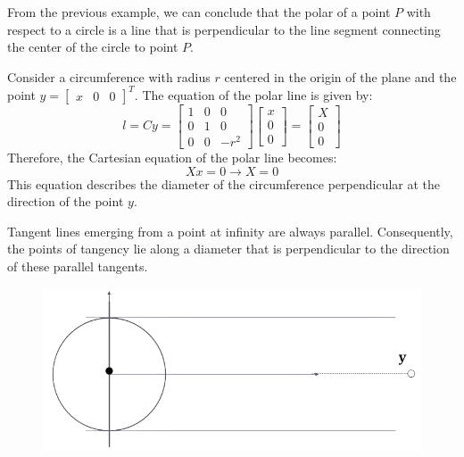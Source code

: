 From the previous example, we can conclude that the polar of a point $P$ with respect to a circle is a line that is perpendicular to the line segment connecting the center of the circle to point $P$. 
\begin{example}
    Consider a circumference with radius $r$ centered in the origin of the plane and the point $y={\begin{bmatrix} x & 0 & 0 \end{bmatrix}}^T$.
    The equation of the polar line is given by:
    \[
    l=Cy=
    \begin{bmatrix}
        1 & 0 & 0 \\
        0 & 1 & 0 \\
        0 & 0 & -r^2
    \end{bmatrix}    
    \begin{bmatrix}
        x \\
        0 \\
        0 
    \end{bmatrix}    
    = 
    \begin{bmatrix}
        X \\
        0 \\
        0 
    \end{bmatrix}  
    \]
    Therefore, the Cartesian equation of the polar line becomes: 
    \[X x=0 \rightarrow X=0\]
    This equation describes the diameter of the circumference perpendicular at the direction of the point $y$. 
\end{example}
Tangent lines emerging from a point at infinity are always parallel. 
Consequently, the points of tangency lie along a diameter that is perpendicular to the direction of these parallel tangents.    
\begin{figure}[H]
    \centering
    \includegraphics[width=0.5\linewidth]{images/parallel.png}
\end{figure}
